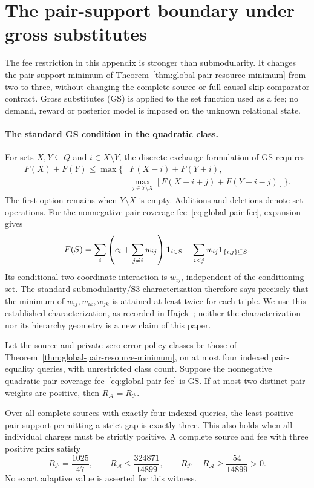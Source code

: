 \section{The pair-support boundary under gross substitutes}
\label{app:gs-pair-support}
The fee restriction in this appendix is stronger than submodularity.
It changes the pair-support minimum of
Theorem~\ref{thm:global-pair-resource-minimum} from two to three,
without changing the complete-source or full causal-skip comparator
contract. Gross substitutes (GS) is applied to the set function used
as a fee; no demand, reward or posterior model is imposed on the
unknown relational state.

\paragraph*{The standard GS condition in the quadratic class.}
For sets $X,Y\subseteq Q$ and $i\in X\setminus Y$, the discrete
exchange formulation of GS requires
\begin{align}
 F(X)+F(Y)\leq\max\bigl\{&F(X-i)+F(Y+i),\nonumber\\
 &\max_{j\in Y\setminus X}
       [F(X-i+j)+F(Y+i-j)]\bigr\}.
 \label{eq:gs-exchange}
\end{align}
The first option remains when $Y\setminus X$ is empty. Additions and
deletions denote set operations. For the nonnegative pair-coverage
fee~\eqref{eq:global-pair-fee}, expansion gives
\[
 F(S)=\sum_i\left(c_i+\sum_{j\ne i}w_{ij}\right)
                  {\bf1}_{i\in S}
       -\sum_{i<j}w_{ij}{\bf1}_{\{i,j\}\subseteq S}.
\]
Its conditional two-coordinate interaction is $w_{ij}$, independent
of the conditioning set. The standard submodularity/S3
characterization therefore says precisely that the minimum of
$w_{ij},w_{ik},w_{jk}$ is attained at least twice for each triple.
We use this established characterization, as recorded in
Hajek~\cite[Definition 3 and Proposition 4]{hajek2008substitutes};
neither the characterization nor its hierarchy geometry is a new
claim of this paper.

\begin{theorem}
\label{thm:gs-pair-resource-minimum}
Let the source and private zero-error policy classes be those of
Theorem~\ref{thm:global-pair-resource-minimum}, on at most four
indexed pair-equality queries, with unrestricted class count.
Suppose the nonnegative quadratic pair-coverage
fee~\eqref{eq:global-pair-fee} is GS. If at most two distinct pair
weights are positive, then $R_{\mathcal A}=R_{\mathcal P}$.

Over all complete sources with exactly four indexed queries, the
least positive pair support permitting a strict gap is exactly
three. This also holds when all individual charges must be strictly
positive. A complete source and fee with three positive pairs satisfy
\[
 R_{\mathcal P}=\frac{1025}{47},\qquad
 R_{\mathcal A}\leq\frac{324871}{14899},\qquad
 R_{\mathcal P}-R_{\mathcal A}\geq\frac{54}{14899}>0.
\]
No exact adaptive value is asserted for this witness.
\end{theorem}

